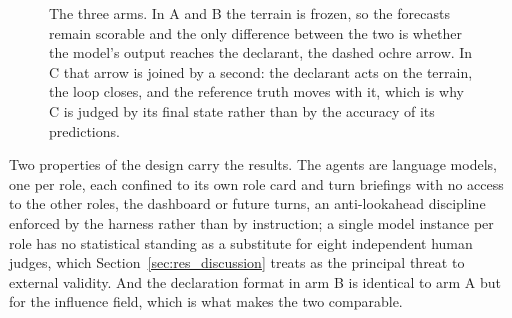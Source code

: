\begin{figure}[htbp]
\centering
{}
\caption[The three arms of the campaign]{The three arms. In A and B the terrain is frozen, so
the forecasts remain scorable and the only difference between the two is whether the model's
output reaches the declarant, the dashed ochre arrow. In C that arrow is joined by a second:
the declarant acts on the terrain, the loop closes, and the reference truth moves with it,
which is why C is judged by its final state rather than by the accuracy of its predictions.}
\label{fig:three_arms}
\end{figure}

Two properties of the design carry the results. The agents are language models, one per role,
each confined to its own role card and turn briefings with no access to the other roles, the
dashboard or future turns, an anti-lookahead discipline enforced by the harness rather than by
instruction; a single model instance per role has no statistical standing as a substitute for
eight independent human judges, which Section~\ref{sec:res_discussion} treats as the principal
threat to external validity. And the declaration format in arm B is identical to arm A but for
the influence field, which is what makes the two comparable.

